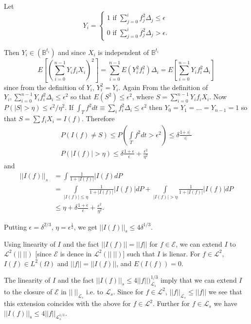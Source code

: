 Let 
$$
Y_i =
\begin{cases}
  1 \text{ if } \sum^ i _{ j = 0} f^2_j \Delta _j \leq \epsilon \\
  0 \text{ if } \sum^ i _{ j = 0} f^2_j \Delta _j > \epsilon.
\end{cases}
$$

Then $Y_i \in (\mathbb{B}^{t_i})$ and since $X_i$ is independent of
$\mathbb{B}^{t_i}$  
$$
E \left[ \left( \sum_{ i = 0}^{ n - 1}  Y_i f_i X_i \right)^2\right] = \sum^{ n
  -1}_{ i = 0} E (Y^2 _i f^2 _i ) \Delta _i = E \left[ \sum_{ i =
    0} ^{ n - 1} Y_i f_i^2 \Delta_i\right] 
$$
since from the definition of $Y_i$, $Y^2_i = Y_i$. Again From the
definition of $Y_i, \sum\limits^{ n - 1} _ { i = 0} Y_i f^2_i
\Delta _i \leq \epsilon^2$ so that $E(S^2) \leq \epsilon^2$, where $S =
\sum\limits_{ i = 0}^{ n - 1} Y_i f_i X_i$. Now $P(|S| > \eta ) \leq
\epsilon^2/\eta^2$. If $\int_T f^2 dt \equiv \sum_i
f^2_i \Delta_i \leq \epsilon^2$ then $Y_0 = Y_1 = \ldots = Y_{n-1} =
1$ so that $S = \sum f_i X_i = I(f)$. Therefore  
\begin{gather*}
  P(I(f)\neq S)\leq P \left(\int\limits_T f^2 dt > \epsilon^2\right) \leq \delta
  \frac{1 + \in}{\in}\\ 
  P (|I (f) | > \eta ) \leq \delta \frac{1 + \epsilon}{\epsilon} + \frac{\epsilon^2}{\eta^2}
\end{gather*}
and 
\begin{align*}
  || I (f) ||_s & = \int \frac{1}{1 + | I (f) |} | I (f) d P\\ 
  & = \int\limits_{ |I(f)|\leq \eta} \frac{1}{1 + | I (f) |} |I(f)|d P +
  \int\limits_{|I(f)|> \eta} \frac{1}{1 + | I(f) |} | I (f)| dP\\ 
  &\leq \eta + \delta \frac{1 + \epsilon}{\epsilon} + \frac{\epsilon^2}{\eta^2}. 
\end{align*}\pageoriginale

Putting $\epsilon = \delta ^{ 2 / 3}$, $\eta = \epsilon^{\frac{1}{2}}$, we get
$|| I(f) ||_s \leq 4 \delta ^{ 1 / 3}$.  

Using linearity of $I$ and the fact $|| I(f) || = || f ||$ for $f \in
\mathscr{E}$, we can extend $I$ to $\mathscr{L}^2 (|| ~ ||)$ [since
  $\mathscr{E}$ is dence in $\mathscr{L}^2(|| ~ ||)]$ such that $I$
is lienar. For $f \in \mathscr{L}^2$, $I(f) \in L^2 (\Omega)$ and $||
  f || = || I(f)||$, and $E (I(f)) = 0$.  

The linearity of $I$ and the fact $|| I(f) ||_s \leq 4 || f ||)_{
  \mathscr{L}_s}^{1/3}$ imply that we can extend $I$ to the closure of
$\mathscr{E}$ in $||~||_{\mathscr{L}_{s}}$ i.e.
to $\mathscr{L}_s$. Since for $f \in
\mathscr{L}^2$, $|| f ||_{\mathscr{L}_s} \leq || f||$ we see that this
extension coincides with the above for $f \in \mathscr{L}^2$. Further
for $f \in \mathscr{L}_s$ we have $|| I(f) ||_s \leq 4 || f
||_{\mathscr{L}_{s}^{ 1 /3}}$.   


